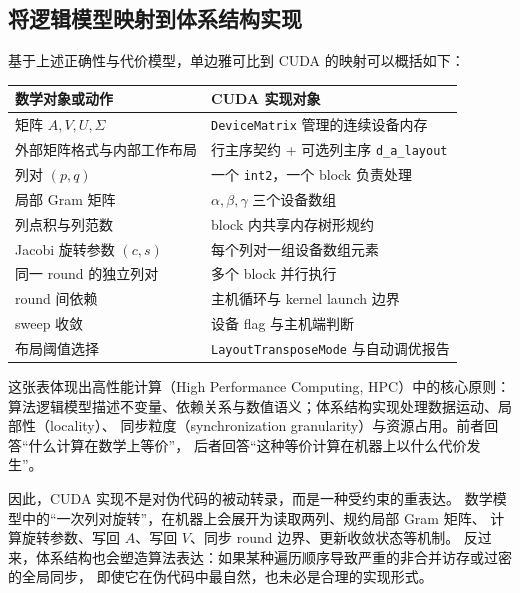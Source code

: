 \subsection{将逻辑模型映射到体系结构实现}

基于上述正确性与代价模型，单边雅可比到 CUDA 的映射可以概括如下：

\begin{table}[htbp]
    \centering
    \begin{tabular}{ll}
        \toprule
        数学对象或动作               & CUDA 实现对象                            \\
        \midrule
        矩阵 \(A,V,U,\Sigma\)   & \texttt{DeviceMatrix} 管理的连续设备内存      \\
        外部矩阵格式与内部工作布局         & 行主序契约 + 可选列主序 \texttt{d\_a\_layout}  \\
        列对 \((p,q)\)          & 一个 \texttt{int2}，一个 block 负责处理       \\
        局部 Gram 矩阵            & \(\alpha,\beta,\gamma\) 三个设备数组       \\
        列点积与列范数               & block 内共享内存树形规约                      \\
        Jacobi 旋转参数 \((c,s)\) & 每个列对一组设备数组元素                         \\
        同一 round 的独立列对        & 多个 block 并行执行                        \\
        round 间依赖             & 主机循环与 kernel launch 边界               \\
        sweep 收敛              & 设备 flag 与主机端判断                       \\
        布局阈值选择                & \texttt{LayoutTransposeMode} 与自动调优报告 \\
        \bottomrule
    \end{tabular}
\end{table}

这张表体现出高性能计算（High Performance Computing, HPC）中的核心原则：
算法逻辑模型描述不变量、依赖关系与数值语义；体系结构实现处理数据运动、局部性（locality）、
同步粒度（synchronization granularity）与资源占用。前者回答“什么计算在数学上等价”，
后者回答“这种等价计算在机器上以什么代价发生”。

因此，CUDA 实现不是对伪代码的被动转录，而是一种受约束的重表达。
数学模型中的“一次列对旋转”，在机器上会展开为读取两列、规约局部 Gram 矩阵、
计算旋转参数、写回 \(A\)、写回 \(V\)、同步 round 边界、更新收敛状态等机制。
反过来，体系结构也会塑造算法表达：如果某种遍历顺序导致严重的非合并访存或过密的全局同步，
即使它在伪代码中最自然，也未必是合理的实现形式。

